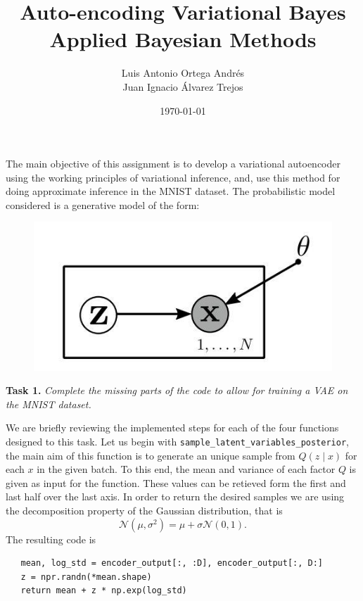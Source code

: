 \documentclass[11pt]{article}
\author{Luis Antonio Ortega Andrés \\\medskip Juan Ignacio Álvarez Trejos}
\date{\today}
\title{Auto-encoding Variational Bayes\\\medskip
\large Applied Bayesian Methods}
\begin{document}
\maketitle

The main objective of this assignment is to develop a variational autoencoder using the working principles of variational inference, and, use this method for doing approximate inference in the MNIST dataset. The probabilistic model considered is a generative model of the form:

\begin{figure}[h]
  \centering
  \includegraphics[scale = 0.5]{imgs/model.jpg}
 \end{figure}

 \textbf{Task 1.} \emph{Complete the missing parts of the code to allow for training a VAE on the MNIST dataset.}

 We are briefly reviewing the implemented steps for each of the four functions designed to this task. Let us begin with \texttt{sample\_latent\_variables\_posterior}, the main aim of this function is to generate an unique sample from \( Q(z \mid x) \) for each \( x \) in the given batch. To this end, the mean and variance of each factor \( Q \) is given as input for the function. These values can be retieved form the first and last half over the last axis. In order to return the desired samples we are using the decomposition property of the Gaussian distribution, that is
 \[
   \mathcal{N}(\mu, \sigma^{2}) = \mu + \sigma \mathcal{N}(0, 1).
 \]
 The resulting code is
 \begin{verbatim}
   mean, log_std = encoder_output[:, :D], encoder_output[:, D:]
   z = npr.randn(*mean.shape)
   return mean + z * np.exp(log_std)
 \end{verbatim}
\end{document}
